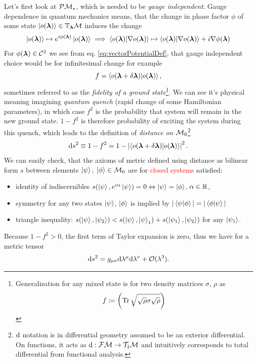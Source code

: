 Let's first look at $\mathcal{P}\mathcal{M}_s$, which is needed to be \emph{gauge independent}. Gauge dependence in quantum mechanics means, that the change in phase factor $\phi$ of some state $\ket{o({\bm\lambda})}\in \mathbb{T}_{\bm\lambda}\mathcal{M}$ induces the change 
\begin{equation}
    \ket{o({\bm\lambda})}\mapsto e^{i\phi({\bm\lambda})} \ket{o({\bm\lambda})} \implies \braket{o({\bm\lambda})|\nabla o({\bm\lambda})}\mapsto \braket{o({\bm\lambda})|\nabla o({\bm\lambda})} + i\nabla \phi({\bm\lambda}) 
\end{equation} 
For $\phi({\bm\lambda})\in \mathcal C^2$ we see from eq. \ref{eq:vectorPotentialDef}, that gauge independent choice would be for infinitesimal change for example
\begin{equation}
    f=\braket{o(\bm{{\bm\lambda}}+\delta\bm{{\bm\lambda}})|o(\bm{{\bm\lambda}})},
    \label{eq:fidelityDefinition}
\end{equation}
sometimes referred to as the \emph{fidelity of a ground state}\footnote{Generalization for any mixed state is for two density matrices $\sigma$, $\rho$ as $$f\coloneqq \left(\operatorname{\textrm{Tr}} \sqrt{\sqrt{\rho}\sigma\sqrt{\rho}}\right)$$}. We can see it's physical meaning imagining \emph{quantum quench} (rapid change of some Hamiltonian parameters), in which case $f^2$ is the probability that system will remain in the new ground state. $1-f^2$ is therefore probability of exciting the system during this quench, which leads to the definition of \emph{distance on $\mathcal{M}_0$}\footnote{$\mathrm{d}$ notation is in differential geometry assumed to be an exterior differential. On functions, it acts as $\mathrm{d}: \mathcal{F}\mathcal{M}\rightarrow \mathcal{T}_1\mathcal{M}$ and intuitively corresponds to total differential from functional analysis.}
\begin{equation}
    \mathrm{d} s^2 \equiv 1-f^2= 1-\left|\braket{o(\bm{{\bm\lambda}}+\delta\bm{{\bm\lambda}})|o(\bm{{\bm\lambda}})}\right|^2.
    \label{eq:distanceOnM0}
\end{equation}
We can easily check, that the axioms of metric defined using distance as bilinear form $s$ between elements $\ket{\psi},\; \ket{\phi}\in \mathcal{M}_0$ are for \textcolor{red}{closed systems} satisfied:
\begin{itemize}
    \item identity of indiscernibles $s(\ket{\psi},e^{i\alpha}\ket{\psi}) = 0 \Leftrightarrow \ket{\psi}=\ket{\phi}$, $\alpha\in\mathbb{R}$,
    \item symmetry for any two states $\ket{\psi}$, $\ket{\phi}$ is implied by $|\braket{\psi|\phi}|=|\braket{\phi|\psi}|$
    \item triangle inequality: $s(\ket{\psi},\ket{\psi_2}) <s(\ket{\psi},\ket{\psi}_1) + s(\ket{\psi_1},\ket{\psi_2})$ for any $\ket{\psi_1}$.
\end{itemize}
Because $1-f^2>0$, the first term of Taylor expansion is zero, thus we have for a metric tensor
\begin{equation}
    \mathrm{d} s^2 = g_{\mu\nu}\mathrm{d} \lambda^\mu \mathrm{d}\lambda^\nu+\mathcal{O}(\lambda^3).
    \label{eq:metricTensorDef}
\end{equation} 


